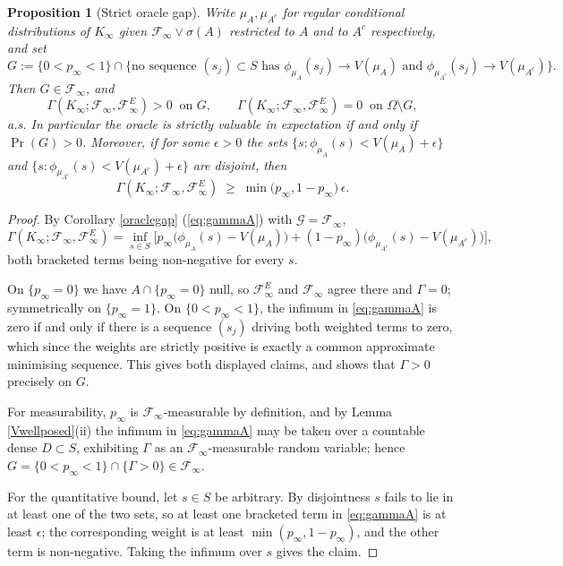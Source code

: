 \documentclass{article}
\newcommand{\F}{\mathcal{F}}
\newcommand{\1}{\mathbbm{1}}
\newtheorem{prop}{Proposition}
\begin{document}
\begin{prop}[Strict oracle gap]
\label{oraclestrict}
Write $\mu_A,\mu_{A^c}$ for regular conditional distributions of $K_\infty$ given
$\F_\infty\vee\sigma(A)$ restricted to $A$ and to $A^c$ respectively, and set
\[
G:=\big\{0<p_\infty<1\big\}\cap
\Big\{\text{no sequence }(s_j)\subset S\text{ has }\phi_{\mu_A}(s_j)\to V(\mu_A)
\text{ and }\phi_{\mu_{A^c}}(s_j)\to V(\mu_{A^c})\Big\}.
\]
Then $G\in\F_\infty$, and
\[
\Gamma(K_\infty;\F_\infty,\F^E_\infty)>0\ \text{ on }G,
\qquad
\Gamma(K_\infty;\F_\infty,\F^E_\infty)=0\ \text{ on }\Omega\setminus G,
\]
a.s. In particular the oracle is strictly valuable in expectation if and only if $\Pr(G)>0$.
Moreover, if for some $\epsilon>0$ the sets
$\{s:\phi_{\mu_A}(s)<V(\mu_A)+\epsilon\}$ and $\{s:\phi_{\mu_{A^c}}(s)<V(\mu_{A^c})+\epsilon\}$ are
disjoint, then
\[
\Gamma(K_\infty;\F_\infty,\F^E_\infty)\;\ge\;\min\big(p_\infty,1-p_\infty\big)\,\epsilon .
\]
\end{prop}

\begin{proof}
By Corollary \ref{oraclegap} (\ref{eq:gammaA}) with $\mathcal{G}=\F_\infty$,
\[
\Gamma(K_\infty;\F_\infty,\F^E_\infty)
=\inf_{s\in S}\Big[p_\infty\big(\phi_{\mu_A}(s)-V(\mu_A)\big)
+(1-p_\infty)\big(\phi_{\mu_{A^c}}(s)-V(\mu_{A^c})\big)\Big],
\]
both bracketed terms being non-negative for every $s$.

On $\{p_\infty=0\}$ we have $A\cap\{p_\infty=0\}$ null, so $\F^E_\infty$ and $\F_\infty$ agree there
and $\Gamma=0$; symmetrically on $\{p_\infty=1\}$. On $\{0<p_\infty<1\}$, the infimum in
\eqref{eq:gammaA} is zero if and only if there is a sequence $(s_j)$ driving both weighted terms to
zero, which since the weights are strictly positive is exactly a common approximate minimising
sequence. This gives both displayed claims, and shows that $\Gamma>0$ precisely on $G$.

For measurability, $p_\infty$ is $\F_\infty$-measurable by definition, and by Lemma
\ref{Vwellposed}(ii) the infimum in \eqref{eq:gammaA} may be taken over a countable dense
$D\subset S$, exhibiting $\Gamma$ as an $\F_\infty$-measurable random variable; hence
$G=\{0<p_\infty<1\}\cap\{\Gamma>0\}\in\F_\infty$.

For the quantitative bound, let $s\in S$ be arbitrary. By disjointness $s$ fails to lie in at least
one of the two sets, so at least one bracketed term in \eqref{eq:gammaA} is at least $\epsilon$;
the corresponding weight is at least $\min(p_\infty,1-p_\infty)$, and the other term is
non-negative. Taking the infimum over $s$ gives the claim.
\end{proof}
\end{document}
